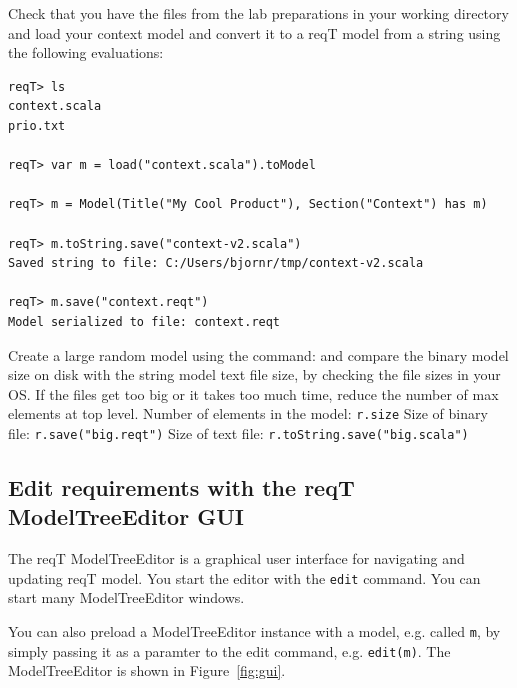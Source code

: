 \documentclass[11pt]{article}
\begin{document}
\begin{framed}\noindent
Check that you have the files from the lab preparations in your working directory and load your context model and convert it to a reqT model from a string using the following evaluations: 
{\scriptsize \begin{verbatim}
reqT> ls
context.scala
prio.txt

reqT> var m = load("context.scala").toModel

reqT> m = Model(Title("My Cool Product"), Section("Context") has m)

reqT> m.toString.save("context-v2.scala")
Saved string to file: C:/Users/bjornr/tmp/context-v2.scala

reqT> m.save("context.reqt")
Model serialized to file: context.reqt
\end{verbatim}}
\noindent Create a large random model using the command:  \newline and compare the binary model size on disk with the string model text file size, by checking the file sizes in your OS. If the files get too big or it takes too much time, reduce the number of max elements at top level.\newline
\newline Number of elements in the model: {\footnotesize\verb+r.size+} \underline{\hspace{2cm}} 
\newline Size of binary file: {\footnotesize\verb+r.save("big.reqt")+}  \underline{\hspace{2cm}} 
\newline Size of text file: {\footnotesize\verb+r.toString.save("big.scala")+} \underline{\hspace{2cm}}
\end{framed}

\subsection{Edit requirements with the reqT ModelTreeEditor GUI}

The reqT ModelTreeEditor is a graphical user interface for navigating and updating reqT model. You start the editor with the \verb+edit+ command. You can start many ModelTreeEditor windows. 

You can also preload a ModelTreeEditor instance with a model, e.g. called \verb+m+, by simply passing it as a paramter to the edit command, e.g. \verb+edit(m)+. The ModelTreeEditor is shown in Figure~\ref{fig:gui}.
\end{document}
